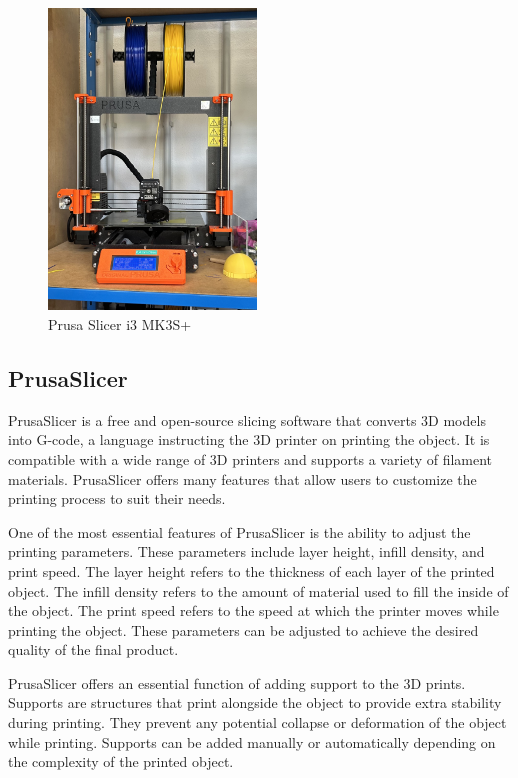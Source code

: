 \begin{figure}
    \centering
    \includegraphics[height=8cm]{texs/Part1/chapter1/image/prusa.jpg}
    \caption{Prusa Slicer i3 MK3S+}
    \label{fig:prusa_slicer_mk3}
\end{figure}

\subsection{PrusaSlicer}
\label{subsec:prusa_slicer}

PrusaSlicer is a free and open-source slicing software that converts 3D models into G-code, a language instructing the 3D printer on printing the object. It is compatible with a wide range of 3D printers and supports a variety of filament materials. PrusaSlicer offers many features that allow users to customize the printing process to suit their needs.

One of the most essential features of PrusaSlicer is the ability to adjust the printing parameters. These parameters include layer height, infill density, and print speed. The layer height refers to the thickness of each layer of the printed object. The infill density refers to the amount of material used to fill the inside of the object. The print speed refers to the speed at which the printer moves while printing the object. These parameters can be adjusted to achieve the desired quality of the final product.

PrusaSlicer offers an essential function of adding support to the 3D prints. Supports are structures that print alongside the object to provide extra stability during printing. They prevent any potential collapse or deformation of the object while printing. Supports can be added manually or automatically depending on the complexity of the printed object.

